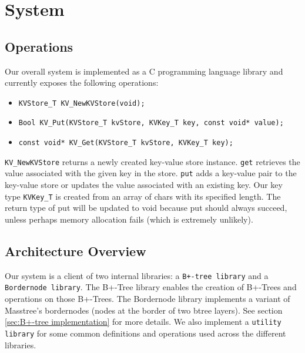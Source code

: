 \section{System} \label{sec:Our System}

\subsection{Operations} \label{sec:kvstore operations}
Our overall system is implemented as a C programming language library and currently exposes the following operations:
    
    \begin{itemize}
        \item \texttt{KVStore\_T KV\_NewKVStore(void);}
        \item \texttt{Bool KV\_Put(KVStore\_T kvStore, KVKey\_T key, const void* value);} %
        \item \texttt{const void* KV\_Get(KVStore\_T kvStore, KVKey\_T key);}
    \end{itemize}

\texttt{KV\_NewKVStore} returns a newly created key-value store instance. \texttt{get} retrieves the value associated with the given key in the store. \texttt{put} adds a key-value pair to the key-value store or updates the value associated with an existing key. Our key type \texttt{KVKey\_T} is created from an array of chars with its specified length. The return type of put will be updated to void because put should always succeed, unless perhaps memory allocation fails (which is extremely unlikely).

\subsection{Architecture Overview}

Our system is a client of two internal libraries: a \texttt{B+-tree library} and a \texttt{Bordernode library}. The B+-Tree library enables the creation of B+-Trees and operations on those B+-Trees. The Bordernode library implements a variant of Masstree's \cite{masstree} bordernodes (nodes at the border of two btree layers). See section \ref{sec:B+-tree implementation} for more details. We also implement a \texttt{utility library} for some common definitions and operations used across the different libraries. 

